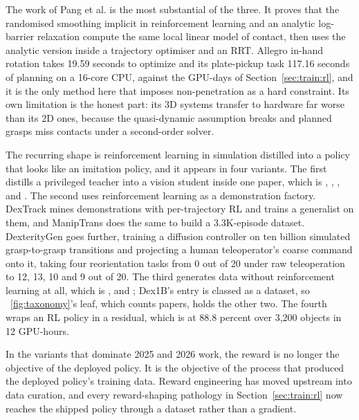 The work of Pang et al. \cite{pang_global_planning_2022} is the most substantial of the three.
It proves that the randomised smoothing implicit in reinforcement learning and an analytic
log-barrier relaxation compute the same local linear model of contact, then uses the analytic
version inside a trajectory optimiser and an RRT. Allegro in-hand rotation takes 19.59 seconds
to optimize and its plate-pickup task 117.16 seconds of planning on a 16-core CPU, against the
GPU-days of Section~\ref{sec:train:rl}, and it is the only method here that imposes
non-penetration as a hard constraint. Its own limitation is the honest part: its 3D systems
transfer to hardware far worse than its 2D ones, because the quasi-dynamic assumption breaks
and planned grasps miss contacts under a second-order solver.

\label{sec:train:hybrids}
The recurring
shape is reinforcement learning in simulation distilled into a policy that looks like an
imitation policy, and it appears in four variants. The first distills a privileged teacher into
a vision student inside one paper, which is \cite{hora_2022}, \cite{visual_dexterity_2022},
\cite{rotateit_2023}, \cite{robot_synesthesia_2023} and \cite{viserdex_2026}. The second uses
reinforcement learning as a demonstration factory. DexTrack \cite{dextrack_2025} mines
demonstrations with per-trajectory RL and trains a generalist on them, and ManipTrans
\cite{maniptrans_2025} does the same to build a 3.3K-episode dataset. DexterityGen
\cite{dexteritygen_2025} goes further, training a diffusion controller on ten billion simulated
grasp-to-grasp transitions and projecting a human teleoperator's coarse command onto it, taking
four reorientation tasks from 0 out of 20 under raw teleoperation to 12, 13, 10 and 9 out of
20. The third generates data without reinforcement learning at all, which is
\cite{dexmimicgen_2024}, \cite{dex1b_2025} and \cite{deximit_2026}; Dex1B's entry is classed as a
dataset, so \figurename~\ref{fig:taxonomy}'s leaf, which counts papers, holds the other
two. The fourth wraps an RL policy in a residual, which is \cite{resdex_2024} at 88.8 percent
over 3,200 objects in 12 GPU-hours.

In the variants that dominate 2025 and 2026 work, the reward is no longer the objective of the
deployed policy. It is the objective of the process that produced the deployed policy's
training data. Reward engineering has moved upstream into data curation, and every
reward-shaping pathology in Section~\ref{sec:train:rl} now reaches the shipped policy through a
dataset rather than a gradient.

